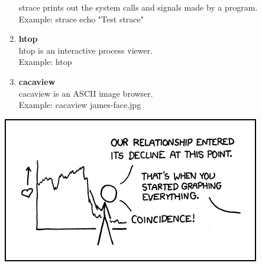 \documentclass[9pt]{extarticle} %
\begin{document}
\begin{minipage}[t]{.61\linewidth}
\begin{enumerate}[leftmargin=0.2cm]
 	strace prints out the system calls and signals made by a program. \\
 	Example: strace echo "Test strace" 
 	\item \textbf{htop}\\
 	htop is an interactive process viewer. \\
 	Example: htop
 	\item \textbf{cacaview}\\
 	cacaview is an ASCII image browser.\\
 	Example: cacaview james-face.jpg\\
 \end{enumerate}



\end{minipage} %

\centering\vspace{0.5cm}\includegraphics[width=0.78\linewidth]{imgs/decline.png}
\end{document}

